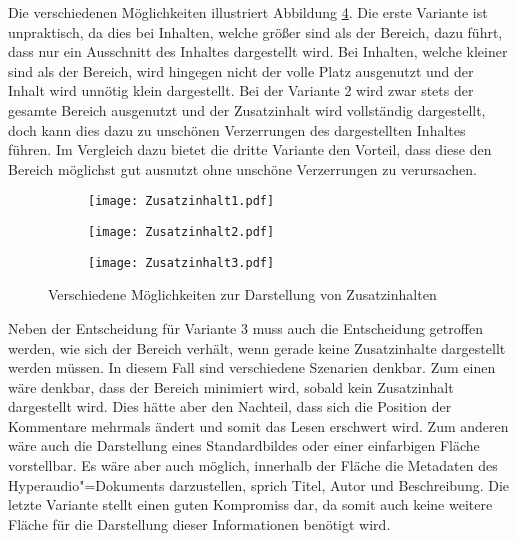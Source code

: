 Die verschiedenen Möglichkeiten illustriert Abbildung \ref{fig:Zusatzinhalt}. Die erste Variante ist unpraktisch, da dies bei Inhalten, welche größer sind als der Bereich, dazu führt, dass nur ein Ausschnitt des Inhaltes dargestellt wird. Bei Inhalten, welche kleiner sind als der Bereich, wird hingegen nicht der volle Platz ausgenutzt und der Inhalt wird unnötig klein dargestellt. Bei der Variante 2 wird zwar stets der gesamte Bereich ausgenutzt und der Zusatzinhalt wird vollständig dargestellt, doch kann dies dazu zu unschönen Verzerrungen des dargestellten Inhaltes führen. Im Vergleich dazu bietet die dritte Variante den Vorteil, dass diese den Bereich möglichst gut ausnutzt ohne unschöne Verzerrungen zu verursachen.

\begin{figure}[h!]
\begin{subfigure}[c]{0.33\textwidth}
\texttt{[image: Zusatzinhalt1.pdf]}
\label{fig:Zusatzinhalt1}
\end{subfigure}
\begin{subfigure}[c]{0.33\textwidth}
\texttt{[image: Zusatzinhalt2.pdf]}
\label{fig:Zusatzinhalt2}
\end{subfigure}
\begin{subfigure}[c]{0.33\textwidth}
\texttt{[image: Zusatzinhalt3.pdf]}
\label{fig:Zusatzinhalt3}
\end{subfigure}
\caption{Verschiedene Möglichkeiten zur Darstellung von Zusatzinhalten}
\label{fig:Zusatzinhalt}
\end{figure}

Neben der Entscheidung für Variante 3 muss auch die Entscheidung getroffen werden, wie sich der Bereich verhält, wenn gerade keine Zusatzinhalte dargestellt werden müssen. In diesem Fall sind verschiedene Szenarien denkbar. Zum einen wäre denkbar, dass der Bereich minimiert wird, sobald kein Zusatzinhalt dargestellt wird. Dies hätte aber den Nachteil, dass sich die Position der Kommentare mehrmals ändert und somit das Lesen erschwert wird. Zum anderen wäre auch die Darstellung eines Standardbildes oder einer einfarbigen Fläche vorstellbar. Es wäre aber auch möglich, innerhalb der Fläche die Metadaten des Hyperaudio"=Dokuments darzustellen, sprich Titel, Autor und Beschreibung. Die letzte Variante stellt einen guten Kompromiss dar, da somit auch keine weitere Fläche für die Darstellung dieser Informationen benötigt wird.

